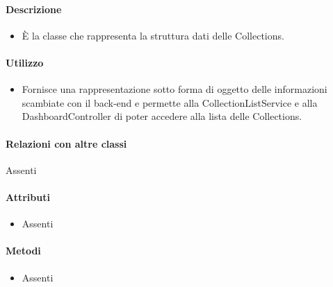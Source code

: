 \paragraph*{Descrizione}
\begin{itemize}
\item[] È la classe che rappresenta la struttura dati delle Collections.
\end{itemize}

\paragraph*{Utilizzo}
\begin{itemize}
\item[] Fornisce una rappresentazione sotto forma di oggetto delle informazioni scambiate con il back-end e permette alla CollectionListService e alla DashboardController di poter accedere alla lista delle Collections.
\end{itemize}

\paragraph*{Relazioni con altre classi}
Assenti

\paragraph*{Attributi}
\begin{itemize}
\item[] Assenti
\end{itemize}

\paragraph*{Metodi}
\begin{itemize}
\item[] Assenti
\end{itemize}
